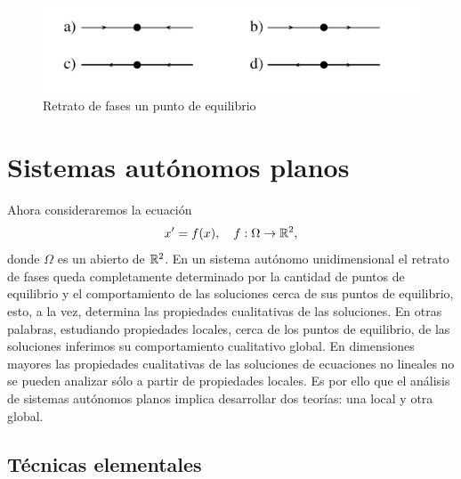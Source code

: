 \begin{figure}[h]
\begin{center}
\includegraphics[scale=.5]{imagenes/RetraFasesPuntoEquilibrio.png}
\end{center}
\caption{Retrato de fases un punto de equilibrio}\label{retrato2}
\end{figure}



\section{Sistemas autónomos planos}
Ahora consideraremos la ecuación
\begin{equation}\label{sisautplano}
    x'=f(x),\quad f:\Omega\to\mathbb{R}^2,
\end{equation}
donde $\Omega$ es un abierto de $\mathbb{R}^2$.  En un sistema autónomo
unidimensional el retrato de fases queda completamente determinado
por la cantidad de puntos de equilibrio
 y el comportamiento de las soluciones cerca de sus puntos
de equilibrio, esto, a la vez, determina las propiedades
cualitativas de las soluciones. En otras palabras, estudiando
propiedades locales, cerca de los puntos de equilibrio, de las
soluciones inferimos su comportamiento cualitativo global. En
dimensiones mayores las propiedades cualitativas de las soluciones
de ecuaciones no lineales  no se pueden analizar sólo a partir de
propiedades locales. Es por ello que el análisis de sistemas
autónomos planos implica desarrollar dos teorías: una local y otra
global.

\subsection{Técnicas elementales}

